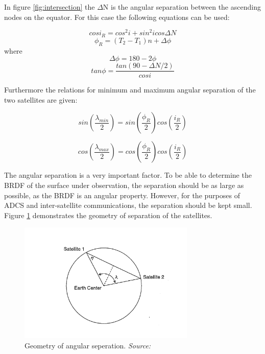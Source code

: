 In figure \ref{fig:intersection} the $\Delta$N is the angular separation between the ascending nodes on the equator. For this case the following equations can be used:

\begin{equation}
cos i_R = cos^2i+sin^2i cos \Delta N
\label{ir}
\end{equation}
\begin{equation}
\phi_R = (T_2-T_1)n+ \Delta \phi
\label{phir}
\end{equation}
where
\begin{equation}
\Delta \phi = 180 - 2 \phi
\label{deltaPhi}
\end{equation}
\begin{equation}
tan \phi = \frac{tan ( 90 - \Delta N / 2)}{cos i}
\label{tanphi}
\end{equation}

Furthermore the relations for minimum and maximum angular separation of the two satellites are given:

\begin{equation}
sin ( \frac{\lambda_{min}}{2} ) = sin ( \frac{ \phi_R }{2} ) cos ( \frac{i_R}{2} )
\label{lambdamin}
\end{equation}

\begin{equation}
cos ( \frac{\lambda_{max}}{2} ) = cos ( \frac{ \phi_R }{2} ) cos ( \frac{i_R}{2} )
\label{lambdamax}
\end{equation}

The angular separation is a very important factor. To be able to determine the \ac{BRDF} of the surface under observation, the separation should be as large as possible, as the \ac{BRDF} is an angular property. However, for the purposes of \ac{ADCS} and inter-satellite communications, the separation should be kept small. Figure \ref{fig:earthangle} demonstrates the geometry of separation of the satellites.

\begin{figure}[ht!]
\centering
\includegraphics[width=0.75\textwidth, angle=0]{chapters/img/geometry.png}

\caption{Geometry of angular seperation. \emph{Source: \cite{constDesign}}}
\label{fig:earthangle}
\end{figure}


